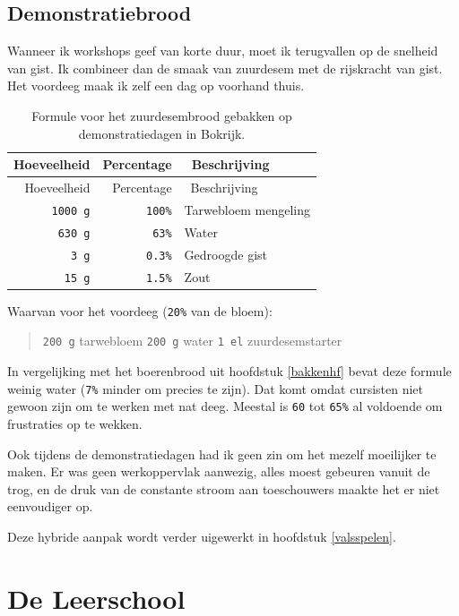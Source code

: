 \documentclass[
  11pt,
  dutch,
]{memoir}
\begin{document}
\newpage

\hypertarget{demonstratiebrood}{%
\section{Demonstratiebrood}\label{demonstratiebrood}}

\label{demonstratiebrood}

Wanneer ik workshops geef van korte duur, moet ik terugvallen op de
snelheid van gist. Ik combineer dan de smaak van zuurdesem met de
rijskracht van gist. Het voordeeg maak ik zelf een dag op voorhand
thuis.

\begin{longtable}[]{@{}rrl@{}}
\caption{Formule voor het zuurdesembrood gebakken op demonstratiedagen
in Bokrijk. \label{tablebokrijk}}\tabularnewline
\toprule
Hoeveelheid & Percentage & ~Beschrijving\tabularnewline
\midrule
\endfirsthead
\toprule
Hoeveelheid & Percentage & ~Beschrijving\tabularnewline
\midrule
\endhead
\texttt{1000\ g} & \texttt{100\%} & Tarwebloem mengeling\tabularnewline
\texttt{630\ g} & \texttt{63\%} & Water\tabularnewline
\texttt{3\ g} & \texttt{0.3\%} & Gedroogde gist\tabularnewline
\texttt{15\ g} & \texttt{1.5\%} & Zout\tabularnewline
\bottomrule
\end{longtable}

Waarvan voor het voordeeg (\texttt{20\%} van de bloem):

\begin{quote}
\texttt{200\ g} tarwebloem \newline \texttt{200\ g} water \newline
\texttt{1\ el} zuurdesemstarter
\end{quote}

In vergelijking met het boerenbrood uit hoofdstuk \ref{bakkenhf} bevat
deze formule weinig water (\texttt{7\%} minder om precies te zijn). Dat
komt omdat cursisten niet gewoon zijn om te werken met nat deeg. Meestal
is \texttt{60} tot \texttt{65\%} al voldoende om frustraties op te
wekken.

Ook tijdens de demonstratiedagen had ik geen zin om het mezelf
moeilijker te maken. Er was geen werkoppervlak aanwezig, alles moest
gebeuren vanuit de trog, en de druk van de constante stroom aan
toeschouwers maakte het er niet eenvoudiger op.

Deze hybride aanpak wordt verder uigewerkt in hoofdstuk
\ref{valsspelen}.

\hypertarget{de-leerschool}{%
\chapter{De Leerschool}\label{de-leerschool}}
\end{document}
